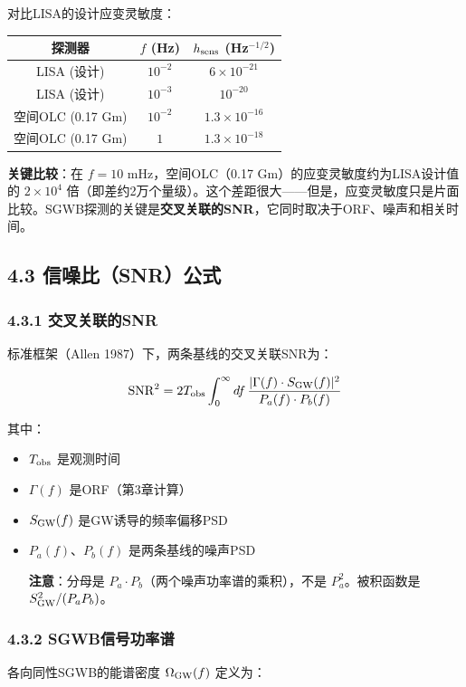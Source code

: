\documentclass[12pt,a4paper]{article}
\begin{document}
对比LISA的设计应变灵敏度：

\begin{tabular}{|c|c|c|}
\hline
探测器 & $f$ (Hz) & $h_{\rm sens}$ (Hz$^{-1/2}$) \\
\hline
LISA (设计) & $10^{-2}$ & $6 \times 10^{-21}$ \\
LISA (设计) & $10^{-3}$ & $10^{-20}$ \\
空间OLC (0.17 Gm) & $10^{-2}$ & $1.3 \times 10^{-16}$ \\
空间OLC (0.17 Gm) & $1$ & $1.3 \times 10^{-18}$ \\
\hline
\end{tabular}


\textbf{关键比较}：在 $f = 10$ mHz，空间OLC（0.17 Gm）的应变灵敏度约为LISA设计值的 $2 \times 10^4$ 倍（即差约2万个量级）。这个差距很大——但是，应变灵敏度只是片面比较。SGWB探测的关键是\textbf{交叉关联的SNR}，它同时取决于ORF、噪声和相关时间。

\subsection{4.3 信噪比（SNR）公式}


\subsubsection{4.3.1 交叉关联的SNR}


标准框架（Allen 1987）下，两条基线的交叉关联SNR为：

$${\rm SNR}^2 = 2 T_{\rm obs} \int_0^\infty df\, \frac{|\Gamma(f) \cdot S_{\rm GW}(f)|^2}{P_a(f) \cdot P_b(f)}$$

其中：
\begin{itemize}
  \item $T_{\rm obs}$ 是观测时间
  \item $\Gamma(f)$ 是ORF（第3章计算）
  \item $S_{\rm GW}(f)$ 是GW诱导的频率偏移PSD
  \item $P_a(f)$、$P_b(f)$ 是两条基线的噪声PSD

\textbf{注意}：分母是 $P_a \cdot P_b$（两个噪声功率谱的乘积），不是 $P_a^2$。被积函数是 $S_{\rm GW}^2 / (P_a P_b)$。

\end{itemize}
\subsubsection{4.3.2 SGWB信号功率谱}


各向同性SGWB的能谱密度 $\Omega_{\rm GW}(f)$ 定义为：
\end{document}
